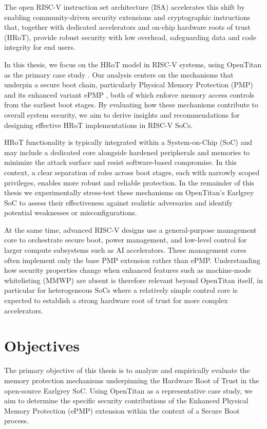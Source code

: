 \documentclass[10pt,a4paper,twocolumn,twoside]{article}
\begin{document}
The open RISC-V instruction set architecture (ISA) \cite{isa} accelerates this shift by enabling community-driven security extensions and cryptographic instructions that, together with dedicated accelerators and on-chip hardware roots of trust (HRoT), provide robust security with low overhead, safeguarding data and code integrity for end users.

In this thesis, we focus on the HRoT model in RISC-V systems, using OpenTitan as the primary case study \cite{opentitan}. Our analysis centers on the mechanisms that underpin a secure boot chain, particularly Physical Memory Protection (PMP) \cite{pmp} and its enhanced variant ePMP \cite{epmp}, both of which enforce memory access controls from the earliest boot stages. By evaluating how these mechanisms contribute to overall system security, we aim to derive insights and recommendations for designing effective HRoT implementations in RISC-V SoCs.

HRoT functionality is typically integrated within a System-on-Chip (SoC) and may include a dedicated core alongside hardened peripherals and memories to minimize the attack surface and resist software-based compromise. In this context, a clear separation of roles across boot stages, each with narrowly scoped privileges, enables more robust and reliable protection.  In the remainder of this thesis we experimentally stress-test these mechanisms on OpenTitan's Earlgrey SoC to assess their effectiveness against realistic adversaries and identify potential weaknesses or misconfigurations.

At the same time, advanced RISC-V designs use a general-purpose management core to orchestrate secure boot, power management, and low-level control for larger compute subsystems such as AI accelerators. These management cores often implement only the base PMP extension rather than ePMP. Understanding how security properties change when enhanced features such as machine-mode whitelisting (MMWP) are absent is therefore relevant beyond OpenTitan itself, in particular for heterogeneous SoCs where a relatively simple control core is expected to establish a strong hardware root of trust for more complex accelerators.



\section{Objectives}
The primary objective of this thesis is to analyze and empirically evaluate the memory protection mechanisms underpinning the Hardware Root of Trust in the open-source Earlgrey SoC. Using OpenTitan as a representative case study, we aim to determine the specific security contributions of the Enhanced Physical Memory Protection (ePMP) \cite{epmp} extension within the context of a Secure Boot process.
\end{document}
